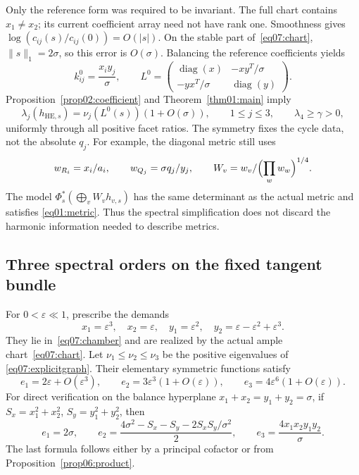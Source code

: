 \documentclass[11pt]{amsart}
\theoremstyle{definition}
\theoremstyle{remark}
\newcommand{\diag}{\operatorname{diag}}
\begin{document}
Only the reference form was required to be invariant. The full
chart contains \(x_1\ne x_2\); its current coefficient array
need not have rank one.
Smoothness gives
\(\log(c_{ij}(s)/c_{ij}(0))=O(|s|)\).
On the stable part of~\eqref{eq07:chart},
\(\|s\|_1=2\sigma\), so this error is \(O(\sigma)\).
Balancing the reference coefficients yields
\begin{equation}\label{eq07:explicitgraph}
 k^0_{ij}=\frac{x_i y_j}{\sigma},\qquad
 L^0=
 \begin{pmatrix}
 \diag(x)&-xy^T/\sigma\\
 -yx^T/\sigma&\diag(y)
 \end{pmatrix}.
\end{equation}
Proposition~\ref{prop02:coefficient} and
Theorem~\ref{thm01:main} imply
\[
 \lambda_j(h_{\mathrm{HE},s})
 =\nu_j(L^0(s))(1+O(\sigma)),\qquad 1\leq j\leq3,
 \qquad \lambda_4\geq\gamma>0,
\]
uniformly through all positive facet ratios.
The symmetry fixes the cycle data, not the absolute \(q_j\).
For example, the diagonal metric still uses
\[
 w_{R_i}=x_i/a_i,\qquad w_{Q_j}=\sigma q_j/y_j,\qquad
 W_v=w_v/\Bigl(\prod_ww_w\Bigr)^{1/4}.
\]
The model \(\Phi_s^*(\bigoplus_vW_vh_{v,s})\) has the same
determinant as the actual metric and satisfies
\eqref{eq01:metric}. Thus the spectral simplification does not
discard the harmonic information needed to describe metrics.

\subsection{Three spectral orders on the fixed tangent bundle}

For \(0<\varepsilon\ll1\), prescribe the demands
\begin{equation}\label{eq07:threeorders}
 x_1=\varepsilon^3,\quad x_2=\varepsilon,\quad
 y_1=\varepsilon^2,\quad
 y_2=\varepsilon-\varepsilon^2+\varepsilon^3.
\end{equation}
They lie in~\eqref{eq07:chamber} and are realized by the actual
ample chart~\eqref{eq07:chart}.
Let \(\nu_1\leq\nu_2\leq\nu_3\) be the positive eigenvalues of
\eqref{eq07:explicitgraph}. Their elementary symmetric
functions satisfy
\begin{equation}\label{eq07:symmetric}
 e_1=2\varepsilon+O(\varepsilon^3),\qquad
 e_2=3\varepsilon^3(1+O(\varepsilon)),\qquad
 e_3=4\varepsilon^6(1+O(\varepsilon)).
\end{equation}
For direct verification on the balance hyperplane
\(x_1+x_2=y_1+y_2=\sigma\), if
\(S_x=x_1^2+x_2^2\), \(S_y=y_1^2+y_2^2\), then
\[
 e_1=2\sigma,\qquad
 e_2=\frac{4\sigma^2-S_x-S_y-2S_xS_y/\sigma^2}{2},
 \qquad
 e_3=\frac{4x_1x_2y_1y_2}{\sigma}.
\]
The last formula follows either by a principal cofactor or
from Proposition~\ref{prop06:product}.
\end{document}
